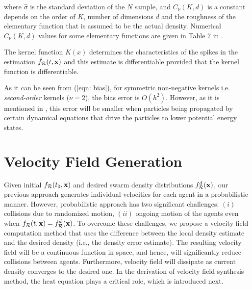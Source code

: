 \documentclass{ifacconf}
\newcommand{\Rconf}{{\mathcal R}}
\newcommand{\bx}{{\bf x}}
\begin{document}
where $\hat{\sigma}$ is the standard deviation of the $N$ sample, and $C_\nu(K,d)$ is a constant depends on the order of $K$, number of dimensions $d$ and the roughness of the elementary function that is assumed to be the actual density. Numerical $C_\nu(K,d)$ values for some elementary functions are given in Table 7 in \cite{hansen2009lecture}.

\begin{rem}
	The kernel function $K(x)$ determines the characteristics of the spikes in the estimation $\hat{f}_\Rconf(t,\bx)$ and this estimate is differentiable  provided that the kernel function is differentiable.
\end{rem}

\begin{rem} \label{rmk: error}
	As it can be seen from (\ref{eqn: bias}), for symmetric non-negative kernels i.e. \emph{second-order} kernels ($\nu = 2$), the bias error is $O(h^2)$. However, as it is mentioned in \cite{monaghan2005smoothed}, this error will be smaller when particles being propagated by certain dynamical equations that drive the particles  to  lower potential energy states. 
\end{rem}


\section{Velocity Field Generation}%
Given initial $f_\Rconf(t_0,\bx)$ and desired swarm density distributions $f_\Rconf^d(\bx)$, our previous approach \cite{swarm_denc13_ifac,swarm_coll13,demir2015probabilistic,demir2015decentralized} generates individual velocities for each agent in a probabilistic manner. %
However, probabilistic approach has two significant challenges: $(i)$ collisions due to randomized motion, $(ii)$ ongoing motion of the agents even when $f_\Rconf(t,\bx) = f_\Rconf^d(\bx)$.
To overcome these challenges, we propose a velocity field computation method that uses the difference between the local density estimate and the desired density (i.e., the density error estimate). The resulting velocity field will be a continuous function in space, and hence, will significantly reduce collisions between agents. Furthermore, velocity field will dissipate as current density converges to the desired one.  In the derivation of velocity field synthesis method, the heat equation plays a critical role, which is introduced next. 
\end{document}
